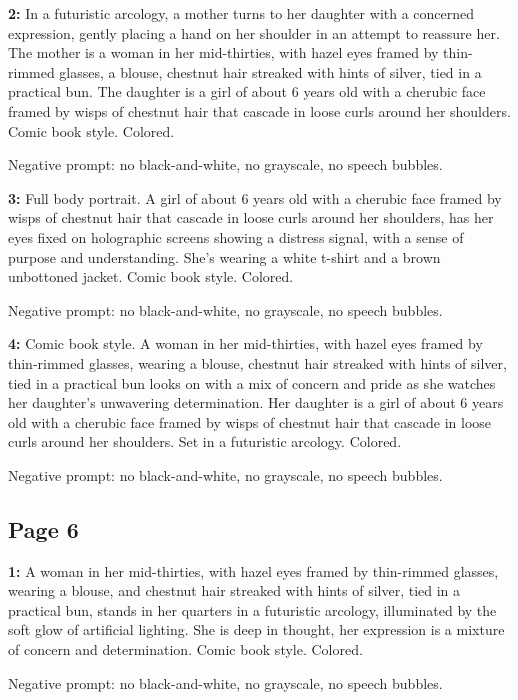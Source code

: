 \begin{iquote}
    \textbf{2:} In a futuristic arcology, a mother turns to her daughter with a concerned expression, gently placing a hand on her shoulder in an attempt to reassure her. The mother is a woman in her mid-thirties, with hazel eyes framed by thin-rimmed glasses, a blouse, chestnut hair streaked with hints of silver, tied in a practical bun. The daughter is a girl of about 6 years old with a cherubic face framed by wisps of chestnut hair that cascade in loose curls around her shoulders. Comic book style. Colored.

    \noindent Negative prompt: no black-and-white, no grayscale, no speech bubbles.
\end{iquote}

\begin{iquote}
    \textbf{3:} Full body portrait. A girl of about 6 years old with a cherubic face framed by wisps of chestnut hair that cascade in loose curls around her shoulders, has her eyes fixed on holographic screens showing a distress signal, with a sense of purpose and understanding. She's wearing a white t-shirt and a brown unbottoned jacket. Comic book style. Colored.

    \noindent Negative prompt: no black-and-white, no grayscale, no speech bubbles.
\end{iquote}

\begin{iquote}
    \textbf{4:} Comic book style. A woman in her mid-thirties, with hazel eyes framed by thin-rimmed glasses, wearing a blouse, chestnut hair streaked with hints of silver, tied in a practical bun looks on with a mix of concern and pride as she watches her daughter's unwavering determination. Her daughter is a girl of about 6 years old with a cherubic face framed by wisps of chestnut hair that cascade in loose curls around her shoulders. Set in a futuristic arcology. Colored.

    \noindent Negative prompt: no black-and-white, no grayscale, no speech bubbles.
\end{iquote}


\subsection*{Page 6}
\begin{iquote}
    \textbf{1:} A woman in her mid-thirties, with hazel eyes framed by thin-rimmed glasses, wearing a blouse, and chestnut hair streaked with hints of silver, tied in a practical bun, stands in her quarters in a futuristic arcology, illuminated by the soft glow of artificial lighting. She is deep in thought, her expression is a mixture of concern and determination. Comic book style. Colored.

    \noindent Negative prompt: no black-and-white, no grayscale, no speech bubbles.
\end{iquote}

